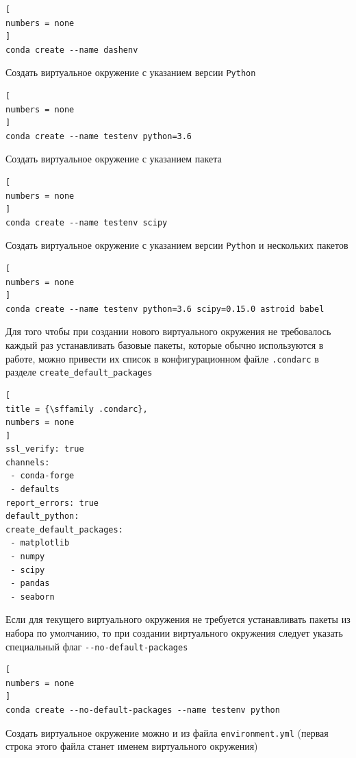 \documentclass[%
	11pt,
	a4paper,
	utf8,
		]{article}
\begin{document}
\begin{lstlisting}[
numbers = none
]
conda create --name dashenv
\end{lstlisting}

Создать виртуальное окружение с указанием версии \texttt{Python}

\begin{lstlisting}[
numbers = none
]
conda create --name testenv python=3.6
\end{lstlisting}

Создать виртуальное окружение с указанием пакета

\begin{lstlisting}[
numbers = none
]
conda create --name testenv scipy
\end{lstlisting}

Создать виртуальное окружение с указанием версии \texttt{Python} и нескольких пакетов

\begin{lstlisting}[
numbers = none
]
conda create --name testenv python=3.6 scipy=0.15.0 astroid babel
\end{lstlisting}


Для того чтобы при создании нового виртуального окружения не требовалось каждый раз устанавливать базовые пакеты, которые обычно используются в работе, можно привести их список в конфигурационном файле \texttt{.condarc} в разделе \texttt{create\_default\_packages}

\begin{lstlisting}[
title = {\sffamily .condarc},
numbers = none
]
ssl_verify: true
channels:
 - conda-forge
 - defaults
report_errors: true
default_python:
create_default_packages:
 - matplotlib
 - numpy
 - scipy
 - pandas
 - seaborn
\end{lstlisting}

Если для текущего виртуального окружения не требуется устанавливать пакеты из набора по умолчанию, то при создании виртуального окружения следует указать специальный флаг
\lstinline{--no-default-packages}

\begin{lstlisting}[
numbers = none
]
conda create --no-default-packages --name testenv python
\end{lstlisting}

Создать виртуальное окружение можно и из файла \texttt{environment.yml} (первая строка этого файла станет именем виртуального окружения)
\end{document}
